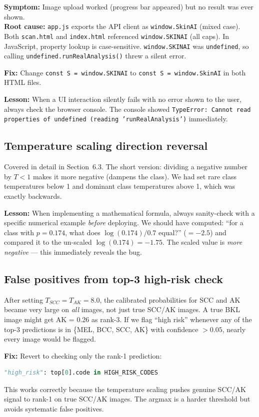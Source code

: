 \documentclass[12pt,a4paper]{article}
\begin{document}
\textbf{Symptom:} Image upload worked (progress bar appeared) but no result was ever shown.\\
\textbf{Root cause:} \texttt{app.js} exports the API client as \texttt{window.SkinAI}
(mixed case). Both \texttt{scan.html} and \texttt{index.html} referenced
\texttt{window.SKINAI} (all caps). In JavaScript, property lookup is case-sensitive.
\texttt{window.SKINAI} was \texttt{undefined}, so calling \texttt{undefined.runRealAnalysis()}
threw a silent error.

\textbf{Fix:} Change \texttt{const S = window.SKINAI} to \texttt{const S = window.SkinAI}
in both HTML files.

\textbf{Lesson:} When a UI interaction silently fails with no error shown to the user, always
check the browser console. The console showed \texttt{TypeError: Cannot read properties of
undefined (reading 'runRealAnalysis')} immediately.

\subsection{Temperature scaling direction reversal}

Covered in detail in Section~6.3. The short version: dividing a negative number by $T < 1$
makes it more negative (dampens the class). We had set rare class temperatures below 1 and
dominant class temperatures above 1, which was exactly backwards.

\textbf{Lesson:} When implementing a mathematical formula, always sanity-check with a
specific numerical example \emph{before} deploying. We should have computed: ``for a class
with $p = 0.174$, what does $\log(0.174) / 0.7$ equal?'' ($= -2.5$) and compared it to
the un-scaled $\log(0.174) = -1.75$. The scaled value is \emph{more negative} --- this
immediately reveals the bug.

\subsection{False positives from top-3 high-risk check}

After setting $T_{SCC} = T_{AK} = 8.0$, the calibrated probabilities for SCC and AK became
very large on \emph{all} images, not just true SCC/AK images. A true BKL image might get
AK = 0.26 as rank-3. If we flag ``high risk'' whenever any of the top-3 predictions is in
\{MEL, BCC, SCC, AK\} with confidence $> 0.05$, nearly every image would be flagged.

\textbf{Fix:} Revert to checking only the rank-1 prediction:
\begin{lstlisting}[language=Python]
"high_risk": top[0].code in HIGH_RISK_CODES
\end{lstlisting}
This works correctly because the temperature scaling pushes genuine SCC/AK signal to rank-1
on true SCC/AK images. The argmax is a harder threshold but avoids systematic false positives.
\end{document}
